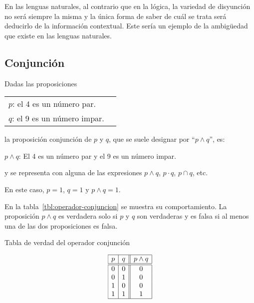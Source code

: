 En las lenguas naturales, al contrario que en la lógica, la variedad de
disyunción no será siempre la misma y la única forma de saber de cuál se
trata será deducirlo de la información contextual. Este sería un ejemplo de
la ambigüedad que existe en las lenguas naturales.





\subsection{Conjunción}

Dadas las proposiciones

\begin{center}
\begin{tabular}{l l}
  $p$: el 4 es un número par. \\
  $q$: el 9 es un número impar.
\end{tabular}
\end{center}

\noindent la proposición conjunción de $p$ y $q$, que se suele designar por
``$p \land q$'', es:

\begin{center}
  $p \land q$: El 4 es un número par y el 9 es un número impar.
\end{center}

\noindent y se representa con alguna de las expresiones $p \land q$, $p
\cdot q$, $p \cap q$, etc.

En este caso, $p = 1$, $q = 1$ y $p \land q = 1$.

En la tabla~\ref{tbl:operador-conjuncion} se muestra su comportamiento. La
proposición $p \land q$ es verdadera solo si $p$ y $q$ son verdaderas y es
falsa si al menos una de las dos proposiciones es falsa.

\begin{table}[h]%
  \caption{Tabla de verdad del operador conjunción}
  \label{tbl:operador-conjuncion}%
  \centering
  $$
    \begin{array}{|c|c||c|}
      \hline
      p & q & p \land q \\
      \hline
      \hline
      0 & 0 & 0 \\
      0 & 1 & 0 \\
      1 & 0 & 0 \\
      1 & 1 & 1 \\
      \hline
    \end{array}
  $$
\end{table}






